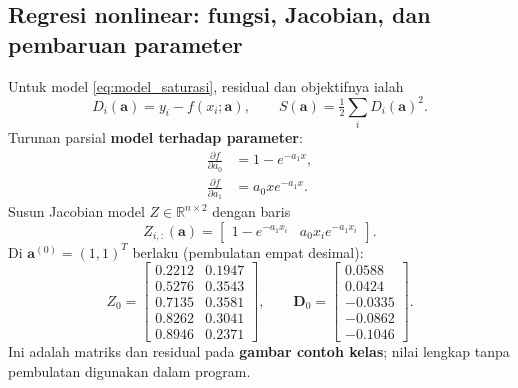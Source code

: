 \subsection{Regresi nonlinear: fungsi, Jacobian, dan pembaruan parameter}
Untuk model \eqref{eq:model_saturasi}, residual dan objektifnya ialah
\begin{equation}
D_i(\mathbf{a})=y_i-f(x_i;\mathbf{a}),\qquad
S(\mathbf{a})=\tfrac12\sum_iD_i(\mathbf{a})^2.
\end{equation}
Turunan parsial \textbf{model terhadap parameter}:
\begin{align}
\frac{\partial f}{\partial a_0}&=1-e^{-a_1x},\\
\frac{\partial f}{\partial a_1}&=a_0x e^{-a_1x}.
\end{align}
Susun Jacobian model $Z\in\mathbb{R}^{n\times2}$ dengan baris
\begin{equation}
Z_{i,:}(\mathbf{a})=
\begin{bmatrix}1-e^{-a_1x_i}&a_0x_i e^{-a_1x_i}\end{bmatrix}.
\end{equation}
Di $\mathbf{a}^{(0)}=(1,1)^T$ berlaku (pembulatan empat desimal):
\begin{equation}
Z_0=\begin{bmatrix}
0.2212&0.1947\\0.5276&0.3543\\0.7135&0.3581\\0.8262&0.3041\\0.8946&0.2371
\end{bmatrix},\qquad
\mathbf{D}_0=\begin{bmatrix}0.0588\\0.0424\\-0.0335\\-0.0862\\-0.1046\end{bmatrix}.
\label{eq:class_Z_D}
\end{equation}
Ini adalah matriks dan residual pada \textbf{gambar contoh kelas}; nilai lengkap tanpa pembulatan digunakan dalam program.

